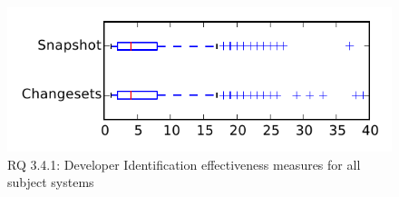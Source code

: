 
\begin{figure}
\centering
\includegraphics[height=0.4\textheight]{figures/dit/rq1_tiny}
\caption{RQ 3.4.1: Developer Identification effectiveness measures for all subject systems}
\label{fig:dit:rq1:tiny}
\end{figure}
